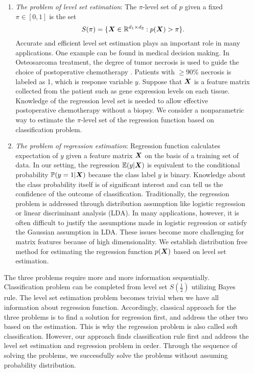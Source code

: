 \documentclass[12pt]{article}
\begin{document}
\begin{enumerate}[label={2.\arabic*}]
\item {\it The problem of level set estimation}: The $\pi$-level set of $p$ given a fixed $\pi\in[0,1]$ is the set 
\begin{align}
S(\pi) = \{\bm X\in\mathbb{R}^{d_1\times d_2}: p(\bm X)>\pi\}.
\end{align}
 Accurate and efficient level set estimation plays an important role in many applications.
 One example can be found in medical decision making. In Osteosarcoma treatment, the degree of tumor necrosis is used to guide the choice of postoperative chemotherapy \citep{man2005expression}. Patients with $\geq 90 \%$ necrosis is labeled as 1, which is response variable $y$. Suppose that $\bm X$ is a feature matrix collected from the patient such as gene expression levels on each tissue. Knowledge of the regression level set is needed to allow effective postoperative chemotherapy without a biopsy. 
 We consider a nonparametric way to estimate the $\pi$-level set of the regression function based on classification problem.
\item {\it The problem of regression estimation}: Regression function calculates expectation of $y$ given a feature matrix $\bm X$ on the basis of a training set of data. In our setting, the regression $ \mathbb{E}(y|\bm X)$  is equivalent to  the conditional probability $\mathbb{P}(y = 1|\bm X)$ because the class label $y$ is binary. Knowledge about the class probability itself is of significant interest and can tell us the confidence of the outcome of classification. Traditionally, the regression problem is addressed 
through distribution assumption like logistic regression or linear discriminant analysis (LDA). In many applications, however, it is often difficult to  justify the assumptions made in logistic regression or satisfy the Gaussian assumption in LDA. These issues become more challenging for matrix features because of high dimensionality.
We establish distribution free method for estimating the regression function $p(\bm X)$ based on level set estimation.  
\end{enumerate}
The three problems require more and more information sequentially.
Classification problem can be completed from level set $S(\frac{1}{2})$ utilizing Bayes rule. The level set estimation problem becomes trivial when we have all information about regression function.  
Accordingly, classical approach for the three problems is to find a solution for regression first, and address the other two based on the estimation. This is why the regression problem is also called soft classification. However, our approach finds classification rule first and address the level set estimation and regression problem in order. Through the sequence of solving the problems, we successfully solve the problems without assuming probability distribution.
\end{document}
